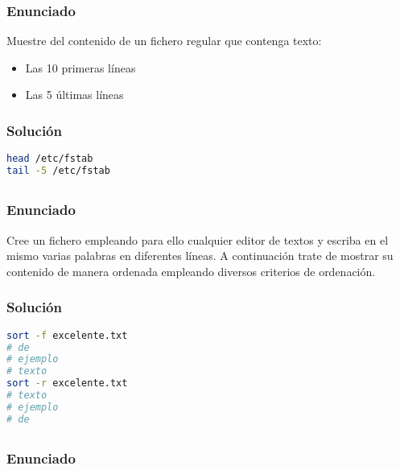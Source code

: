 \subsubsection{Enunciado}

Muestre del contenido de un fichero regular que contenga texto:

\begin{itemize}
	\item Las 10 primeras líneas
	\item Las 5 últimas líneas
\end{itemize}

\subsubsection{Solución}

\begin{lstlisting}[language=sh]
head /etc/fstab
tail -5 /etc/fstab
\end{lstlisting}

\subsection{}\label{ej1-10}

\subsubsection{Enunciado}

Cree un fichero empleando para ello cualquier editor de textos y escriba en el mismo varias palabras en diferentes líneas.
A continuación trate de mostrar su contenido de manera ordenada empleando diversos criterios de ordenación.

\subsubsection{Solución}

\begin{lstlisting}[language=sh]
sort -f excelente.txt
# de
# ejemplo
# texto
sort -r excelente.txt
# texto
# ejemplo
# de
\end{lstlisting}

\subsection{}\label{ej1-11}

\subsubsection{Enunciado}

